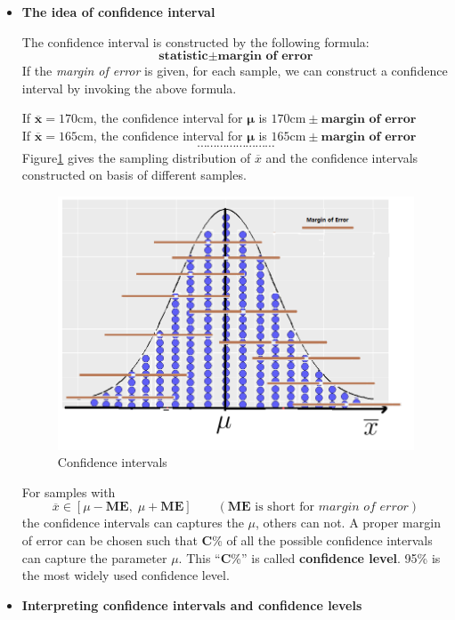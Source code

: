 \documentclass[a4paper, 12pt,twoside]{book}
\begin{document}
   \begin{itemize}
      \item \textbf{The idea of confidence interval}\vspace{0.3cm}
      
      The confidence interval is constructed by the following formula: 
      $$\textbf{statistic} \pm \textbf{margin of error}$$
      If the \textit{margin of error} is given, for each sample, we can construct a confidence interval by invoking the above formula. \vspace{0.3cm}
      
      If  $\mathbf{\overline{x}} = 170$cm, the confidence interval for $\mathbf{\mu}$ is\hspace{0.3cm} $170\text{cm} \pm \textbf{margin of error}$\\
            If  $\mathbf{\overline{x}} = 165$cm, the confidence interval for $\mathbf{\mu}$ is\hspace{0.3cm} $165\text{cm} \pm \textbf{margin of error}$\\
            $$\cdots\cdots\cdots\cdots\cdots\cdots\cdots\cdots$$
 Figure\ref{ConfidenceIntervals} gives the sampling distribution of $\overline{x}$ and the confidence intervals constructed on basis of different samples.
     \begin{figure}[H]
        \centering
        \includegraphics[scale=0.6]{ConfidenceIntervals}
        \vspace{-0.2cm}
        \caption{Confidence intervals}
        \label{ConfidenceIntervals}
     \end{figure}
  For samples with  $$\overline{x} \in [\mu - \textbf{ME},\; \mu + \textbf{ME}]\qquad(\textbf{ME} \text{ is short for} \textit{ margin of error})$$ 
   the confidence intervals can captures the $\mu$, others can not. A proper margin of error can be chosen such that \textbf{C}\% of all the possible confidence intervals can capture the parameter $\mu$. This ``\textbf{C}\%'' is called \textbf{confidence level}. 95\% is the most widely used confidence level. 
      \newpage
      \item \textbf{Interpreting confidence intervals and confidence levels}\vspace{0.6cm}
      


\end{itemize}
\end{document}
